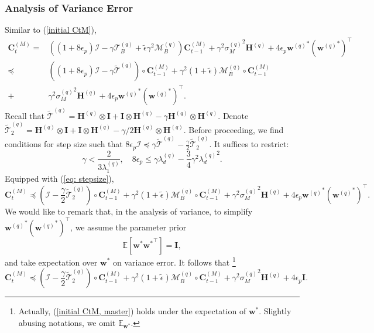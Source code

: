 \documentclass[11pt, letterpaper]{article}
\begin{document}
\subsubsection{Analysis of Variance Error}
Similar to (\ref{initial CtM}),
\begin{equation*}
    \begin{aligned}
        \mathbf{C}_t^{(M)}=&((1+8\epsilon_p)\mathcal{I}-\gamma \mathcal{T}_B^{(q)}+\tilde{\epsilon}\gamma^2\mathcal{M}_B^{(q)})\mathbf{C}_{t-1}^{(M)}+\gamma^2 {\sigma_M^{(q)}}^2\mathbf{H}^{(q)}+4\epsilon_p{\mathbf{w}^{(q)}}^*({\mathbf{w}^{(q)}}^*)^\top\\
        \preceq&((1+8\epsilon_p)\mathcal{I}-\gamma\widetilde{\mathcal{T}}^{(q)})\circ \mathbf{C}_{t-1}^{(M)}+\gamma^2(1+\tilde{\epsilon})\mathcal{M}_B^{(q)}\circ \mathbf{C}_{t-1}^{(M)}\\
        +&\gamma^2{\sigma_M^{(q)}}^2\mathbf{H}^{(q)}+4\epsilon_p{\mathbf{w}^{(q)}}^*({\mathbf{w}^{(q)}}^*)^\top.
    \end{aligned}
\end{equation*}
Recall that $\widetilde{\mathcal{T}}^{(q)}=\mathbf{H}^{(q)}\otimes\mathbf{I}+\mathbf{I}\otimes\mathbf{H}^{(q)}-\gamma\mathbf{H}^{(q)}\otimes\mathbf{H}^{(q)}$. 
Denote $\widetilde{\mathcal{T}}_2^{(q)}=\mathbf{H}^{(q)}\otimes\mathbf{I}+\mathbf{I}\otimes\mathbf{H}^{(q)}-\gamma/2\mathbf{H}^{(q)}\otimes\mathbf{H}^{(q)}$.
Before proceeding, we find conditions for step size such that
$8\epsilon_p\mathcal{I}\preceq\gamma \widetilde{\mathcal{T}}^{(q)}-\frac{\gamma}{2}\widetilde{\mathcal{T}}_2^{(q)}$. It suffices to restrict:
\begin{equation}
    \label{eq: stepsize}
    \gamma < \frac{2}{3\lambda_1^{(q)}},\quad 8\epsilon_p\leq \gamma \lambda_d^{(q)}-\frac{3}{4}\gamma^2{\lambda_d^{(q)}}^2.
\end{equation}
Equipped with (\ref{eq: stepsize}),
\begin{equation*}
    \mathbf{C}_t^{(M)}\preceq(\mathcal{I}-\frac{\gamma}{2}\widetilde{\mathcal{T}}_2^{(q)})\circ \mathbf{C}_{t-1}^{(M)}+\gamma^2(1+\tilde{\epsilon})\mathcal{M}_B^{(q)}\circ \mathbf{C}_{t-1}^{(M)}
    +\gamma^2{\sigma_M^{(q)}}^2\mathbf{H}^{(q)}+4\epsilon_p{\mathbf{w}^{(q)}}^*({\mathbf{w}^{(q)}}^*)^\top.
\end{equation*}
We would like to remark that, in the analysis of variance, to simplify ${\mathbf{w}^{(q)}}^*({\mathbf{w}^{(q)}}^*)^\top$, we assume the parameter prior
\begin{equation*}
    \mathbb{E}\left[\mathbf{w}^*{\mathbf{w}^*}^\top\right]=\mathbf{I},
\end{equation*}
and take expectation over $\mathbf{w}^*$ on variance error. It follows that \footnote{Actually, (\ref{initial CtM, master}) holds under the expectation of $\mathbf{w}^*$.
Slightly abusing notations, we omit $\mathbb{E}_{\mathbf{w}^*}$.}
\begin{equation}
    \label{initial CtM, master}
    \mathbf{C}_t^{(M)}\preceq(\mathcal{I}-\frac{\gamma}{2}\widetilde{\mathcal{T}}_2^{(q)})\circ \mathbf{C}_{t-1}^{(M)}+\gamma^2(1+\tilde{\epsilon})\mathcal{M}_B^{(q)}\circ \mathbf{C}_{t-1}^{(M)}
    +\gamma^2{\sigma_M^{(q)}}^2\mathbf{H}^{(q)}+4\epsilon_p\mathbf{I}.
\end{equation}
\end{document}
